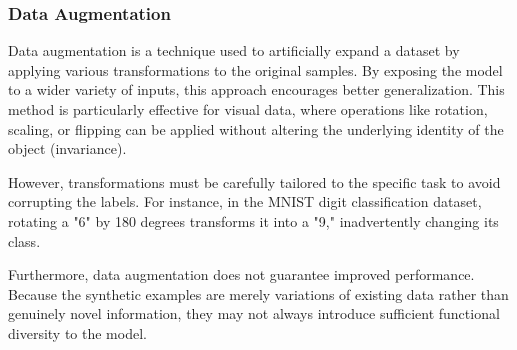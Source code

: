 \subsubsection{Data Augmentation}
Data augmentation is a technique used to artificially expand a dataset by applying various transformations to the original samples. 
By exposing the model to a wider variety of inputs, this approach encourages better generalization.
This method is particularly effective for visual data, where operations like rotation, scaling, or flipping can be applied without altering the underlying identity of the object (invariance). 

However, transformations must be carefully tailored to the specific task to avoid corrupting the labels. 
For instance, in the MNIST digit classification dataset, rotating a "6" by 180 degrees transforms it into a "9," inadvertently changing its class.

Furthermore, data augmentation does not guarantee improved performance. 
Because the synthetic examples are merely variations of existing data rather than genuinely novel information, 
they may not always introduce sufficient functional diversity to the model.

